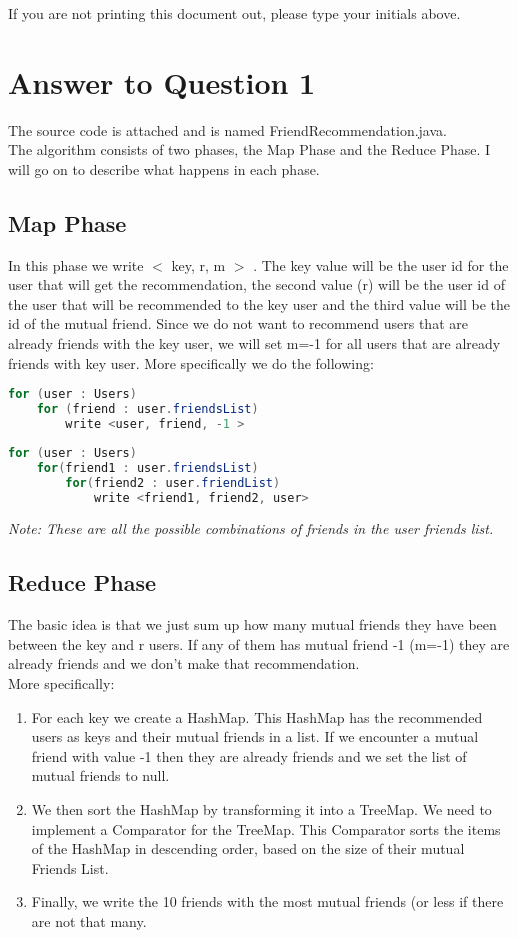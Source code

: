 \documentclass[11pt]{article}
\begin{document}
If you are not printing this document out, please type your initials above.

\vfill
\vfill

\pagebreak[4]
\section*{Answer to Question 1}
The source code is attached and is named FriendRecommendation.java. \\
The algorithm consists of two phases, the Map Phase and the Reduce Phase. I will go on to describe what happens in each phase.

\subsection*{Map Phase}
In this phase we write $<$ key, r, m $>$ . The key value will be the user id for the user that will get the recommendation, the second value (r) will be the user id of the user that will be recommended to the key user and the third value will be the id of the mutual friend. Since we do not want to recommend users that are already friends with the key user, we will set m=-1 for all users that are already friends with key user. 
More specifically we do the following:
\begin{lstlisting}[language=Java]
for (user : Users)
	for (friend : user.friendsList)
		write <user, friend, -1 >
\end{lstlisting}
\begin{lstlisting}[language=Java]
for (user : Users)
	for(friend1 : user.friendsList)
		for(friend2 : user.friendList)
			write <friend1, friend2, user>
\end{lstlisting}
\textit{Note: These are all the possible combinations of friends in the user friends list.}

\subsection*{Reduce Phase} 
The basic idea is that we just sum up how many mutual friends they have been between the key and r users. If any of them has mutual friend -1 (m=-1) they are already friends and we don't make that recommendation. \\
More specifically:\\
\begin{enumerate}
\item For each key we create a HashMap. This HashMap has the recommended users as keys and their mutual friends in a list. If we encounter a mutual friend with value -1 then they are already friends and we set the list of mutual friends to null.
\item We then sort the HashMap by transforming it into a TreeMap. We need to implement a Comparator for the TreeMap. This Comparator sorts the items of the HashMap in descending order, based on the size of their mutual Friends List.
\item Finally, we write the 10 friends with the most mutual friends (or less if there are not that many.
\end{enumerate}
\end{document}
